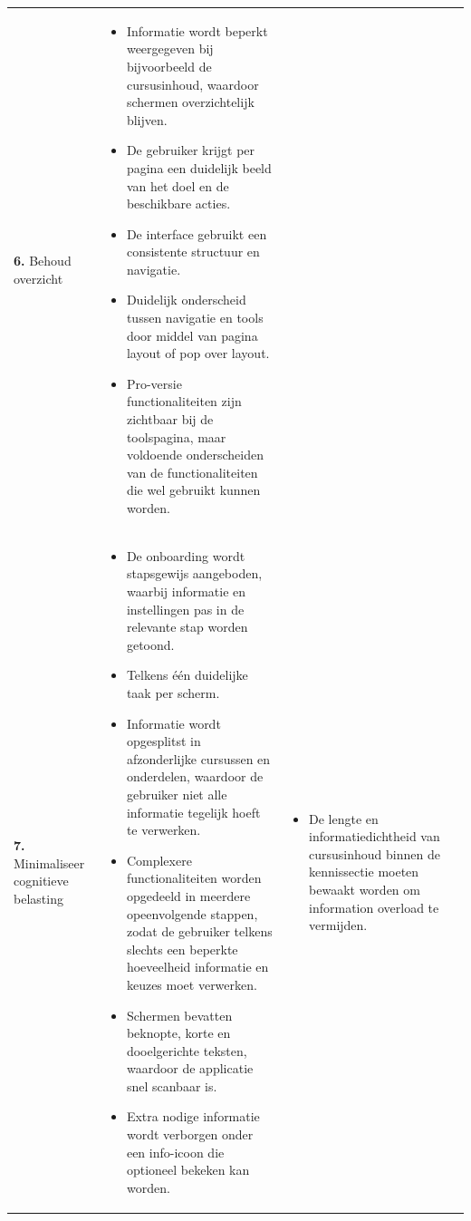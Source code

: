 {\begin{longtable}{
            >{\raggedright\arraybackslash}p{5.23cm}
            >{\raggedright\arraybackslash}p{4.93cm}
            >{\raggedright\arraybackslash}p{4.93cm}
        }
        \textbf{6.} Behoud overzicht
        &  
        \begin{itemize}[nosep,leftmargin=*,itemsep=10pt] 
            \renewcommand{\labelitemi}{+} 
            \item Informatie wordt beperkt weergegeven bij bijvoorbeeld de cursusinhoud, waardoor schermen overzichtelijk blijven.
            \item De gebruiker krijgt per pagina een duidelijk beeld van het doel en de beschikbare acties.
            \item De interface gebruikt een consistente structuur en navigatie.
            \item Duidelijk onderscheid tussen navigatie en tools door middel van pagina layout of pop over layout.
            \item Pro-versie functionaliteiten zijn zichtbaar bij de toolspagina, maar voldoende onderscheiden van de functionaliteiten die wel gebruikt kunnen worden.
        \end{itemize} 
        &
        \\ 
        
        \addlinespace[5pt]
        
        \textbf{7.} Minimaliseer cognitieve belasting
        &  
        \begin{itemize}[nosep,leftmargin=*,itemsep=10pt] 
            \renewcommand{\labelitemi}{+} 
            \item De onboarding wordt stapsgewijs aangeboden, waarbij informatie en instellingen pas in de relevante stap worden getoond.
            \item Telkens één duidelijke taak per scherm.
            \item Informatie wordt opgesplitst in afzonderlijke cursussen en onderdelen, waardoor de gebruiker niet alle informatie tegelijk hoeft te verwerken.
            \item Complexere functionaliteiten worden opgedeeld in meerdere opeenvolgende stappen, zodat de gebruiker telkens slechts een beperkte hoeveelheid informatie en keuzes moet verwerken.
            \item Schermen bevatten beknopte, korte en dooelgerichte teksten, waardoor de applicatie snel scanbaar is.
            \item Extra nodige informatie wordt verborgen onder een info-icoon die optioneel bekeken kan worden.
        \end{itemize} 
        &  
        \begin{itemize}[nosep,leftmargin=*,itemsep=10pt] 
            \renewcommand{\labelitemi}{-} 
            \item De lengte en informatiedichtheid van cursusinhoud binnen de kennissectie moeten bewaakt worden om information overload te vermijden.
        \end{itemize} 
        \\ 
        

\end{longtable}}
